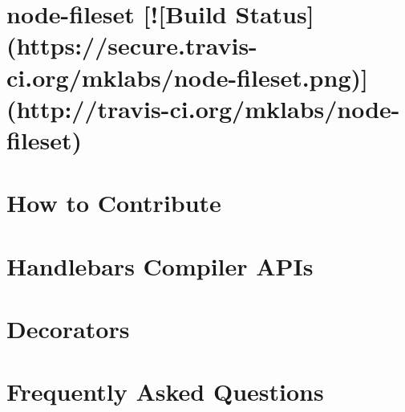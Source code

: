 \documentclass[twoside]{book}
\newcommand{\+}{\discretionary{\mbox{\scriptsize$\hookleftarrow$}}{}{}}
\begin{document}
\chapter{node-\/fileset \mbox{[}!\mbox{[}Build Status\mbox{]}(https\+://secure.travis-\/ci.org/mklabs/node-\/fileset.png)\mbox{]}(http\+://travis-\/ci.org/mklabs/node-\/fileset)}
\label{md__c_1__users_martin__documents__git_hub_visual_studio__bachelor__wis_r__wis_r_node_modules_ist9923cee9d4cf7199bbf92afbd290deb5}
\hypertarget{md__c_1__users_martin__documents__git_hub_visual_studio__bachelor__wis_r__wis_r_node_modules_ist9923cee9d4cf7199bbf92afbd290deb5}{}

\chapter{How to Contribute}
\label{md__c_1__users_martin__documents__git_hub_visual_studio__bachelor__wis_r__wis_r_node_modules_ist36fd7ed4fa38ab81a1aa9b8240c71c9a}
\hypertarget{md__c_1__users_martin__documents__git_hub_visual_studio__bachelor__wis_r__wis_r_node_modules_ist36fd7ed4fa38ab81a1aa9b8240c71c9a}{}

\chapter{Handlebars Compiler A\+P\+Is}
\label{md__c_1__users_martin__documents__git_hub_visual_studio__bachelor__wis_r__wis_r_node_modules_istbe5b06332be747c9eff82a35eaa02e52}
\hypertarget{md__c_1__users_martin__documents__git_hub_visual_studio__bachelor__wis_r__wis_r_node_modules_istbe5b06332be747c9eff82a35eaa02e52}{}

\chapter{Decorators}
\label{md__c_1__users_martin__documents__git_hub_visual_studio__bachelor__wis_r__wis_r_node_modules_istd098275bb989589589872c5795359728}
\hypertarget{md__c_1__users_martin__documents__git_hub_visual_studio__bachelor__wis_r__wis_r_node_modules_istd098275bb989589589872c5795359728}{}

\chapter{Frequently Asked Questions}
\label{md__c_1__users_martin__documents__git_hub_visual_studio__bachelor__wis_r__wis_r_node_modules_ist59a5cf1d93b88fc46e26b3a964e1e957}
\hypertarget{md__c_1__users_martin__documents__git_hub_visual_studio__bachelor__wis_r__wis_r_node_modules_ist59a5cf1d93b88fc46e26b3a964e1e957}{}

\end{document}
